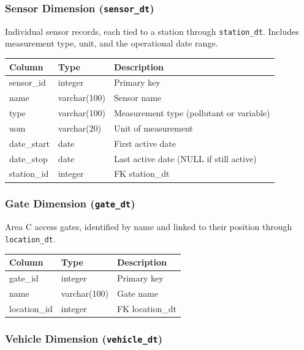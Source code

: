 \documentclass{article}
\begin{document}
	\subsubsection{Sensor Dimension (\textbf{\texttt{sensor\_dt}})}
	
	Individual sensor records, each tied to a station through \texttt{station\_dt}. Includes measurement type, unit, and the operational date range.
	\begin{table}[H]
		\centering
		\begin{tabular}{lll}
			\hline
			Column & Type & Description \\
			\hline
			sensor\_id & integer & Primary key \\
			name & varchar(100) & Sensor name \\
			type & varchar(100) & Measurement type (pollutant or variable) \\
			uom & varchar(20) & Unit of measurement \\
			date\_start & date & First active date \\
			date\_stop & date & Last active date (NULL if still active) \\
			station\_id & integer & FK station\_dt \\
			\hline
		\end{tabular}
	\end{table}
	
	\subsubsection{Gate Dimension (\textbf{\texttt{gate\_dt}})}
	
	Area C access gates, identified by name and linked to their position through \texttt{location\_dt}.
	\begin{table}[H]
		\centering
		\begin{tabular}{lll}
			\hline
			Column & Type & Description \\
			\hline
			gate\_id & integer & Primary key \\
			name & varchar(100) & Gate name \\
			location\_id & integer & FK location\_dt \\
			\hline
		\end{tabular}
	\end{table}
	
	\subsubsection{Vehicle Dimension (\textbf{\texttt{vehicle\_dt}})}
	
\end{document}
